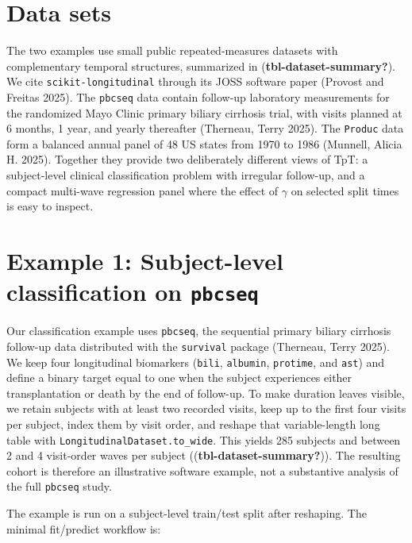 \documentclass[
]{article}
\begin{document}
\section{Data sets}\label{data-sets}

The two examples use small public repeated-measures datasets with
complementary temporal structures, summarized in
(\textbf{tbl-dataset-summary?}). We cite \texttt{scikit-longitudinal}
through its JOSS software paper (Provost and Freitas 2025). The
\texttt{pbcseq} data contain follow-up laboratory measurements for the
randomized Mayo Clinic primary biliary cirrhosis trial, with visits
planned at 6 months, 1 year, and yearly thereafter (Therneau, Terry
2025). The \texttt{Produc} data form a balanced annual panel of 48 US
states from 1970 to 1986 (Munnell, Alicia H. 2025). Together they
provide two deliberately different views of TpT: a subject-level
clinical classification problem with irregular follow-up, and a compact
multi-wave regression panel where the effect of \(\gamma\) on selected
split times is easy to inspect.

\label{tbl-dataset-summary}

\section{\texorpdfstring{Example 1: Subject-level classification on
\texttt{pbcseq}}{Example 1: Subject-level classification on pbcseq}}\label{example-1-subject-level-classification-on-pbcseq}

Our classification example uses \texttt{pbcseq}, the sequential primary
biliary cirrhosis follow-up data distributed with the \texttt{survival}
package (Therneau, Terry 2025). We keep four longitudinal biomarkers
(\texttt{bili}, \texttt{albumin}, \texttt{protime}, and \texttt{ast})
and define a binary target equal to one when the subject experiences
either transplantation or death by the end of follow-up. To make
duration leaves visible, we retain subjects with at least two recorded
visits, keep up to the first four visits per subject, index them by
visit order, and reshape that variable-length long table with
\texttt{LongitudinalDataset.to\_wide}. This yields 285 subjects and
between 2 and 4 visit-order waves per subject
((\textbf{tbl-dataset-summary?})). The resulting cohort is therefore an
illustrative software example, not a substantive analysis of the full
\texttt{pbcseq} study.

The example is run on a subject-level train/test split after reshaping.
The minimal fit/predict workflow is:
\end{document}
